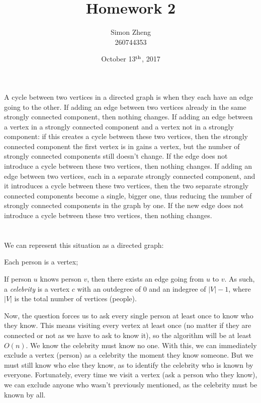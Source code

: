\documentclass[11pt,letterpaper]{article}
\author{Simon Zheng\\260744353}
\title{Homework 2}
\date{October 13$^{\textnormal{th}}$, 2017}
\begin{document}
	\maketitle
	\thispagestyle{fancy}
	
	\section{}
		A cycle between two vertices in a directed graph is when they each have an edge going to the other.
		If adding an edge between two vertices already in the same strongly connected component, then nothing changes.
		If adding an edge between a vertex in a strongly connected component and a vertex not in a strongly component: if this creates a cycle between these two vertices, then the strongly connected component the first vertex is in gains a vertex, but the number of strongly connected components still doesn't change. If the edge does not introduce a cycle between these two vertices, then nothing changes.
		If adding an edge between two vertices, each in a separate strongly connected component, and it introduces a cycle between these two vertices, then the two separate strongly connected components become a single, bigger one, thus reducing the number of strongly connected components in the graph by one. If the new edge does not introduce a cycle between these two vertices, then nothing changes.
	
	\section{}
		We can represent this situation as a directed graph:
		
		Each person is a vertex;
		
		If person $u$ knows person $v$, then there exists an edge going from $u$ to $v$.\newline
		As such, a \textit{celebrity} is a vertex $c$ with an outdegree of $0$ and an indegree of $|V| - 1$, where $|V|$ is the total number of vertices (people).
		
		Now, the question forces us to ask every single person at least once to know who they know. This means visiting every vertex at least once (no matter if they are connected or not as we have to ask to know it), so the algorithm will be at least $O(n)$.
		We know the celebrity must know no one. With this, we can immediately exclude a vertex (person) as a celebrity the moment they know someone. But we must still know who else they know, as to identify the celebrity who is known by everyone.
		Fortunately, every time we visit a vertex (ask a person who they know), we can exclude anyone who wasn't previously mentioned, as the celebrity must be known by all.
		
\end{document}
